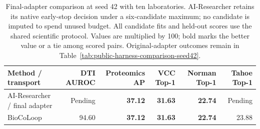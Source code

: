 \begin{table}[t]
\centering\footnotesize
\setlength{\tabcolsep}{3pt}
\begin{tabularx}{\linewidth}{@{}Xrrrrr@{}}
\toprule
Method / transport & DTI AUROC & Proteomics AP & VCC Top-1 & Norman Top-1 & Tahoe Top-1 \\
\midrule
AI-Researcher / final adapter & Pending & \textbf{37.12} & \textbf{31.63} & \textbf{22.74} & Pending \\
BioCoLoop & 94.60 & \textbf{37.12} & \textbf{31.63} & \textbf{22.74} & 23.88 \\
\bottomrule
\end{tabularx}
\caption{Final-adapter comparison at seed 42 with ten laboratories. AI-Researcher retains its native early-stop decision under a six-candidate maximum; no candidate is imputed to spend unused budget. All candidate fits and held-out scores use the shared scientific protocol. Values are multiplied by 100; bold marks the better value or a tie among scored pairs. Original-adapter outcomes remain in Table~\ref{tab:public-harness-comparison-seed42}.}
\label{tab:public-harness-final-adapter}
\end{table}

